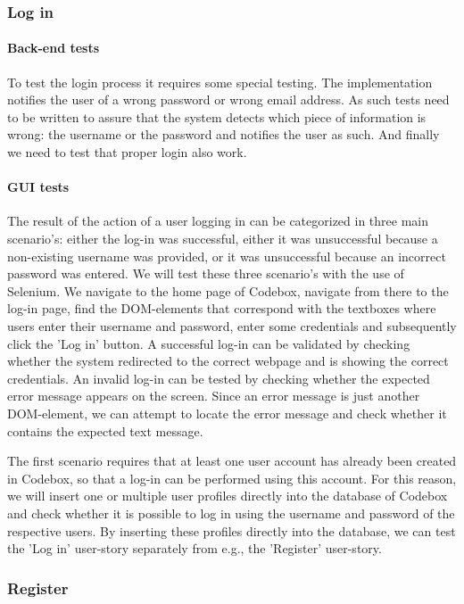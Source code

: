 \documentclass[10pt,a4paper,BCOR12mm, headexclude, footexclude,
  twoside, openright]{scrartcl}
\numberwithin{equation}{section} %
\numberwithin{figure}{section} %
\numberwithin{table}{section} %
\begin{document}
\subsubsection*{Log in}

\paragraph{Back-end tests}
To test the login process it requires some special testing.
The implementation notifies the user of a wrong password or wrong email address.
As such tests need to be written to assure that the system detects which piece of information is wrong: the username or the password and notifies the user as such. And finally we need to test that proper login also work.

\paragraph{GUI tests}
The result of the action of a user logging in can be categorized in three main scenario's: either the log-in was successful, either it was unsuccessful because a non-existing username was provided, or it was unsuccessful because an incorrect password was entered.
We will test these three scenario's with the use of Selenium.
We navigate to the home page of Codebox, navigate from there to the log-in page, find the DOM-elements that correspond with the textboxes where users enter their username and password, enter some credentials and subsequently click the 'Log in' button.
A successful log-in can be validated by checking whether the system redirected to the correct webpage and is showing the correct credentials.
An invalid log-in can be tested by checking whether the expected error message appears on the screen.
Since an error message is just another DOM-element, we can attempt to locate the error message and check whether it contains the expected text message.

The first scenario requires that at least one user account has already been created in Codebox, so that a log-in can be performed using this account.
For this reason, we will insert one or multiple user profiles directly into the database of Codebox and check whether it is possible to log in using the username and password of the respective users.
By inserting these profiles directly into the database, we can test the 'Log in' user-story separately from e.g., the 'Register' user-story.

\subsubsection*{Register}
\end{document}
